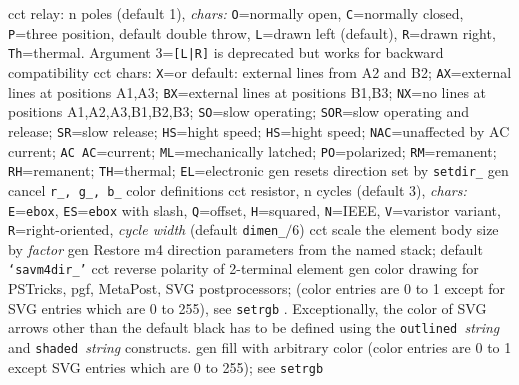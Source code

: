   {cct}
  {relay: n poles (default 1), {\sl chars:} {\tt O}=normally open,
    {\tt C}=normally closed, {\tt P}=three position, default double throw,
    {\tt L}=drawn left (default),
    {\tt R}=drawn right, {\tt Th}=thermal.
    Argument 3={\tt [L|R]} is deprecated but works for
    backward compatibility
   }
  {cct}
  {chars: 
    {\tt X}=or default: external lines from A2 and B2;
    {\tt AX}=external lines at positions A1,A3;
    {\tt BX}=external lines at positions B1,B3;
    {\tt NX}=no lines at positions A1,A2,A3,B1,B2,B3;
    {\tt SO}=slow operating;
    {\tt SOR}=slow operating and release;
    {\tt SR}=slow release;
    {\tt HS}=hight speed;
    {\tt HS}=hight speed;
    {\tt NAC}=unaffected by AC current;
    {\tt AC AC}=current;
    {\tt ML}=mechanically latched;
    {\tt PO}=polarized;
    {\tt RM}=remanent;
    {\tt RH}=remanent;
    {\tt TH}=thermal;
    {\tt EL}=electronic
   }
  {gen}
  {resets direction set by {\tt setdir\_}}
  {gen}
  {cancel {\tt r\_, g\_, b\_} color definitions}
  {cct}
  {resistor, n cycles (default 3), {\sl chars:}
    {\tt E}={\tt ebox},
    {\tt ES}={\tt ebox} with slash,
    {\tt Q}=offset,
    {\tt H}=squared,
    {\tt N}=IEEE,
    {\tt V}=varistor variant,
    {\tt R}=right-oriented,
    {\sl cycle width} (default {\tt dimen\_}$/6$) }
  {cct}
  {scale the element body size by {\sl factor}}
  {gen}
  {Restore m4 direction parameters from the named stack;
    default {\tt `savm4dir\_'}}
  {cct}
  {reverse polarity of 2-terminal element}
  {gen}
  {color drawing for PSTricks, pgf, MetaPost, SVG postprocessors;
   (color entries are 0 to 1 except for SVG entries which are 0 to 255),
   see {\tt setrgb} .
   Exceptionally, the color of
   SVG arrows other than the default black has to be defined using
   the {\tt outlined }{\sl string} and {\tt shaded }{\sl string} constructs.}
  {gen}
  {fill with arbitrary color (color entries are 0 to 1 except 
   SVG entries which are 0 to 255); see {\tt setrgb}}
